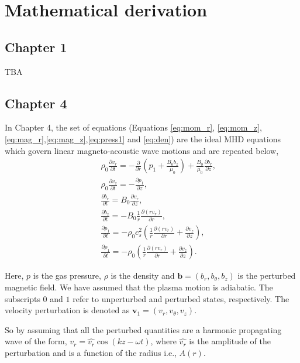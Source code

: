 \chapter{Mathematical derivation} 

\section*{Chapter 1}

TBA 

\section*{Chapter 4}

In Chapter 4, the set of equations (Equations \ref{eq:mom_r}, \ref{eq:mom_z},\ref{eq:mag_r},\ref{eq:mag_z},\ref{eq:press1} and \ref{eq:den}) are the ideal MHD equations which govern linear magneto-acoustic wave motions and are repeated below,
\begin{align}
    &&\rho_0 \frac{\partial v_r}{\partial t}=-\frac{\partial}{\partial r}
    \left(p_1+\frac{B_0b_z}{\mu_0}\right)+\frac{B_0}{\mu_0}\frac{\partial b_r}{\partial z},
    \label{eq:apen_mom_r}\\
    &&\rho_0\frac{\partial v_z}{\partial t}=-\frac{\partial p_1}{\partial z},
    \label{eq:apen_mom_z}\\
    &&\frac{\partial b_r}{\partial t}=B_0\frac{\partial v_r}{\partial z},
    \label{eq:apen_mag_r}\\
    &&\frac{\partial b_z}{\partial t}=-B_0\frac{1}{r}\frac{\partial (rv_r)}{\partial r},
    \label{eq:apen_mag_z}\\
    &&\frac{\partial p_1}{\partial t}=-\rho_0
    c_s^2\left(\frac{1}{r}\frac{\partial(rv_r)}{\partial r}+\frac{\partial v_z}{\partial z}\right),
    \label{eq:apen_press1}\\
    &&\frac{\partial \rho_1}{\partial t}=-\rho_0\left(\frac{1}{r}\frac{\partial (rv_r)}{\partial r}+\frac{\partial v_z}{\partial z}\right).
    \label{eq:apen_den}
\end{align}

Here, $p$ is the gas pressure, $\rho$ is the density and $\textbf{b} = (b_r,b_{\theta},b_z)$ is the perturbed magnetic field.
We have assumed that the plasma motion is adiabatic.
The subscripts $0$ and $1$ refer to unperturbed and perturbed states, respectively.
The velocity perturbation is denoted as $\textbf{v}_1= (v_r,v_{\theta},v_z)$.

So by assuming that all the perturbed quantities are a harmonic propagating wave of the form, $v_r=\hat{v_r}\cos(kz-\omega t)$, where $\hat{v_r}$ is the amplitude of the perturbation and is a function of the radius i.e., $A(r)$.

